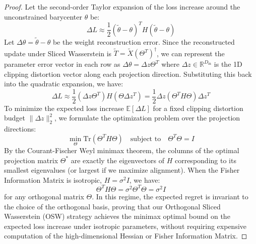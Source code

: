 \documentclass{article}
\theoremstyle{plain}
\theoremstyle{definition}
\theoremstyle{remark}
\begin{document}
\begin{proof}
Let the second-order Taylor expansion of the loss increase around the unconstrained barycenter $\theta$ be:
\begin{equation}
\Delta L \approx \frac{1}{2} (\tilde{\theta} - \theta)^T H (\tilde{\theta} - \theta)
\end{equation}
Let $\Delta \theta = \tilde{\theta} - \theta$ be the weight reconstruction error. Since the reconstructed update under Sliced Wasserstein is $\tilde{T} = \tilde{X} (\Theta^T)^\dagger$, we can represent the parameter error vector in each row as $\Delta \theta = \Delta z \Theta^T$ where $\Delta z \in \mathbb{R}^{D_{\text{in}}}$ is the 1D clipping distortion vector along each projection direction.
Substituting this back into the quadratic expansion, we have:
\begin{equation}
\Delta L \approx \frac{1}{2} (\Delta z \Theta^T) H (\Theta \Delta z^T) = \frac{1}{2} \Delta z (\Theta^T H \Theta) \Delta z^T
\end{equation}
To minimize the expected loss increase $\mathbb{E}[\Delta L]$ for a fixed clipping distortion budget $\|\Delta z\|_2^2$, we formulate the optimization problem over the projection directions:
\begin{equation}
\min_{\Theta} \text{Tr}(\Theta^T H \Theta) \quad \text{subject to} \quad \Theta^T \Theta = I
\end{equation}
By the Courant-Fischer Weyl minimax theorem, the columns of the optimal projection matrix $\Theta^*$ are exactly the eigenvectors of $H$ corresponding to its smallest eigenvalues (or largest if we maximize alignment). 
When the Fisher Information Matrix is isotropic, $H = \sigma^2 I$, we have:
\begin{equation}
\Theta^T H \Theta = \sigma^2 \Theta^T \Theta = \sigma^2 I
\end{equation}
for any orthogonal matrix $\Theta$. In this regime, the expected regret is invariant to the choice of the orthogonal basis, proving that our Orthogonal Sliced Wasserstein (OSW) strategy achieves the minimax optimal bound on the expected loss increase under isotropic parameters, without requiring expensive computation of the high-dimensional Hessian or Fisher Information Matrix.
\end{proof}
\end{document}
